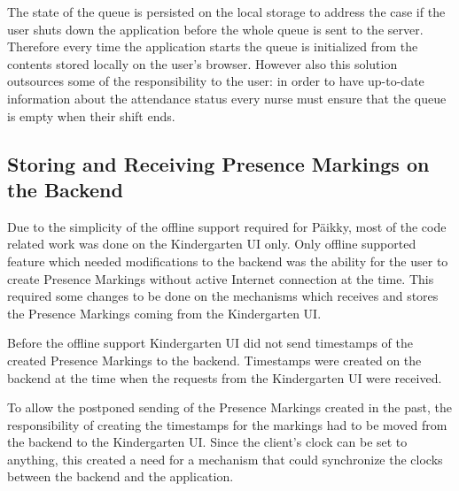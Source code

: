 The state of the queue is persisted on the local storage to address the case if the user shuts down the application before the whole queue is sent to the server. Therefore every time the application starts the queue is initialized from the contents stored locally on the user's browser. However also this solution outsources some of the responsibility to the user: in order to have up-to-date information about the attendance status every nurse must ensure that the queue is empty when their shift ends.  %









\subsection{Storing and Receiving Presence Markings on the Backend}
\label{subsec:backend-implementation}

Due to the simplicity of the offline support required for Päikky, most of the code related work was done on the Kindergarten UI only. Only offline supported feature which needed modifications to the backend was the ability for the user to create Presence Markings without active Internet connection at the time. This required some changes to be done on the mechanisms which receives and stores the Presence Markings coming from the Kindergarten UI. 

Before the offline support Kindergarten UI did not send timestamps of the created Presence Markings to the backend. Timestamps were created on the backend at the time when the requests from the Kindergarten UI were received. 

To allow the postponed sending of the Presence Markings created in the past, the responsibility of creating the timestamps for the markings had to be moved from the backend to the Kindergarten UI. Since the client's clock can be set to anything, this created a need for a mechanism that could synchronize the clocks between the backend and the application.

